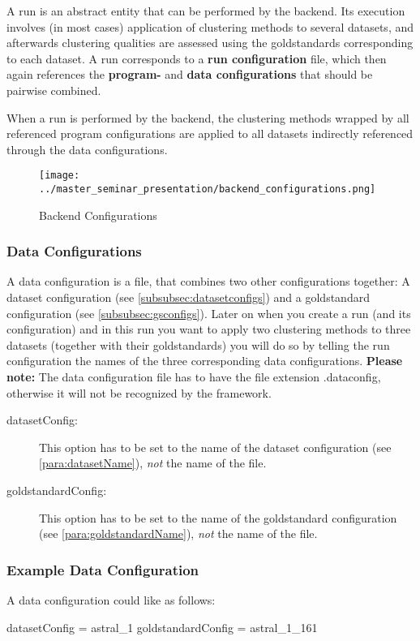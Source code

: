 	A run is an abstract entity that can be performed by the backend. Its execution involves (in most cases) application of clustering methods to several datasets, and afterwards clustering qualities are assessed using the goldstandards corresponding to each dataset. A run corresponds to a \textbf{run configuration} file, which then again references the \textbf{program-} and \textbf{data configurations} that should be pairwise combined.
	
	When a run is performed by the backend, the clustering methods wrapped by all referenced program configurations are applied to all datasets indirectly referenced through the data configurations.
	
	
	\begin{figure}[hbtp]
	\caption{Backend Configurations}
	\label{fig_backend_configurations}
	\centering
	\texttt{[image: ../master\_seminar\_presentation/backend\_configurations.png]} 
	\end{figure}
	

	
		\subsubsection{Data Configurations} \label{subsec:dataconfigs}
		A data configuration is a file, that combines two other configurations together: A dataset configuration (see \ref{subsubsec:datasetconfigs}) and a goldstandard configuration (see \ref{subsubsec:gsconfigs}). Later on when you create a run (and its configuration) and in this run you want to apply two clustering methods to three datasets (together with their goldstandards) you will do so by telling the run configuration the names of the three corresponding data configurations. \textbf{Please note:} The data configuration file has to have the file extension .dataconfig, otherwise it will not be recognized by the framework.
		\begin{description}
		\item[datasetConfig:]
			This option has to be set to the name of the dataset configuration (see \ref{para:datasetName}), \textit{not} the name of the file.
			
		\item[goldstandardConfig:]
			This option has to be set to the name of the goldstandard configuration (see \ref{para:goldstandardName}), \textit{not} the name of the file.
		\end{description}
			
		\subsubsection{Example Data Configuration} A data configuration could like as follows:
\begin{listing}{1}
datasetConfig = astral_1
goldstandardConfig = astral_1_161\end{listing}


